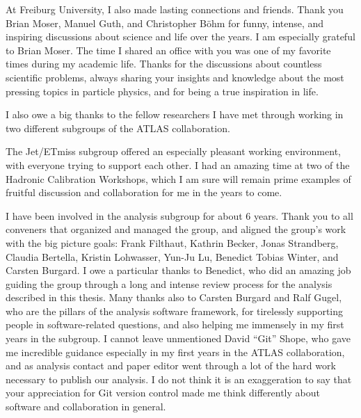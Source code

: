 At Freiburg University, I also made lasting connections and friends. Thank you Brian Moser, Manuel Guth, and Christopher Böhm for funny, intense, and inspiring discussions about science and life over the years.
I am especially grateful to Brian Moser. The time I shared an office with you was one of my favorite times during my academic life. Thanks for the discussions about countless scientific problems, always sharing your insights and knowledge about the most pressing topics in particle physics, and for being a true inspiration in life.

I also owe a big thanks to the fellow researchers I have met through working in two different subgroups of the ATLAS collaboration. 

The Jet/ETmiss subgroup offered an especially pleasant working environment, with everyone trying to support each other. I had an amazing time at two of the Hadronic Calibration Workshops, which I am sure will remain prime examples of fruitful discussion and collaboration for me in the years to come. 

I have been involved in the \HWW analysis subgroup for about 6 years.
Thank you to all conveners that organized and managed the group, and aligned the group's work with the big picture goals: Frank Filthaut, Kathrin Becker, Jonas Strandberg, Claudia Bertella, Kristin Lohwasser, Yun-Ju Lu, Benedict Tobias Winter, and Carsten Burgard. 
I owe a particular thanks to Benedict, who did an amazing job guiding the group through a long and intense review process for the analysis described in this thesis. 
Many thanks also to Carsten Burgard and Ralf Gugel, who are the pillars of the analysis software framework, for tirelessly supporting people in software-related questions, and also helping me immensely in my first years in the \HWW subgroup. 
I cannot leave unmentioned David ``Git'' Shope, who gave me incredible guidance especially in my first years in the ATLAS collaboration, and as analysis contact and paper editor went through a lot of the hard work necessary to publish our analysis. I do not think it is an exaggeration to say that your appreciation for Git version control made me think differently about software and collaboration in general. 

